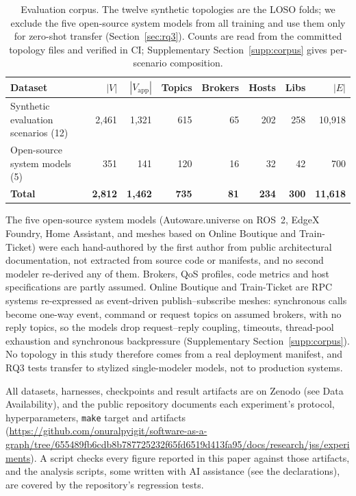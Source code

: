 \documentclass[preprint,3p]{elsarticle}
\newcommand{\sagexperimentsurl}{https://github.com/onuralpyigit/software-as-a-graph/tree/655489fb6cdb8b787725232f65fd6519d413fa95/docs/research/jss/experiments}
\newcommand{\sagexperiments}{\url{\sagexperimentsurl}}
\begin{document}
\begin{table}[htbp]
\centering
\small
\caption{Evaluation corpus. The twelve synthetic topologies are the LOSO folds; we exclude the five open-source system models from all training and use them only for zero-shot transfer (Section~\ref{sec:rq3}). Counts are read from the committed topology files and verified in CI; Supplementary Section~\ref{supp:corpus} gives per-scenario composition.}
\label{tab:4}
\begin{tabular}{lrrrrrrr}
\toprule
\textbf{Dataset} & \textbf{$|V|$} & \textbf{$|V_{\text{app}}|$} & \textbf{Topics} & \textbf{Brokers} & \textbf{Hosts} & \textbf{Libs} & \textbf{$|E|$} \\
\midrule
Synthetic evaluation scenarios (12) & 2{,}461 & 1{,}321 & 615 & 65 & 202 & 258 & 10{,}918 \\
Open-source system models (5)       &    351 &    141 &  120 &  16 &   32 &   42 &    700 \\
\midrule
\textbf{Total} & \textbf{2{,}812} & \textbf{1{,}462} & \textbf{735} & \textbf{81} & \textbf{234} & \textbf{300} & \textbf{11{,}618} \\
\bottomrule
\end{tabular}
\end{table}

The five open-source system models (Autoware.universe on ROS~2, EdgeX Foundry, Home Assistant, and meshes based on Online Boutique and Train-Ticket) were each hand-authored by the first author from public architectural documentation, not extracted from source code or manifests, and no second modeler re-derived any of them. Brokers, QoS profiles, code metrics and host specifications are partly assumed. Online Boutique and Train-Ticket are RPC systems re-expressed as event-driven publish--subscribe meshes: synchronous calls become one-way event, command or request topics on assumed brokers, with no reply topics, so the models drop request--reply coupling, timeouts, thread-pool exhaustion and synchronous backpressure (Supplementary Section~\ref{supp:corpus}). No topology in this study therefore comes from a real deployment manifest, and RQ3 tests transfer to stylized single-modeler models, not to production systems.

All datasets, harnesses, checkpoints and result artifacts are on Zenodo (see Data Availability), and the public repository documents each experiment's protocol, hyperparameters, \texttt{make} target and artifacts (\sagexperiments). A script checks every figure reported in this paper against those artifacts, and the analysis scripts, some written with AI assistance (see the declarations), are covered by the repository's regression tests.
\end{document}
